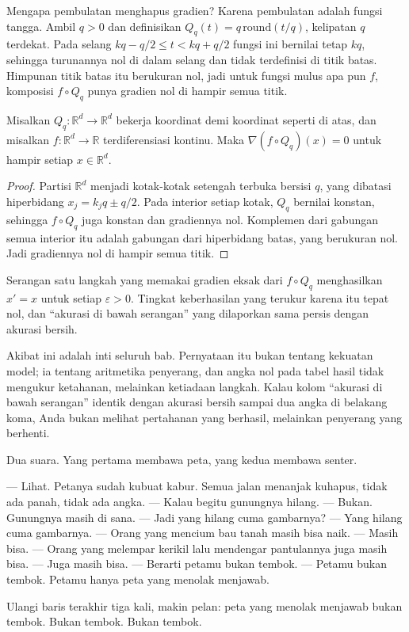 Mengapa pembulatan menghapus gradien? Karena pembulatan adalah fungsi tangga. Ambil
$q>0$ dan definisikan $Q_q(t)=q\,\mathrm{round}(t/q)$, kelipatan $q$ terdekat. Pada
selang $kq-q/2 \le t < kq+q/2$ fungsi ini bernilai tetap $kq$, sehingga turunannya nol
di dalam selang dan tidak terdefinisi di titik batas. Himpunan titik batas itu berukuran
nol, jadi untuk fungsi mulus apa pun $f$, komposisi $f\circ Q_q$ punya gradien nol di
hampir semua titik.

\begin{proposisi}
Misalkan $Q_q\colon\mathbb{R}^d\to\mathbb{R}^d$ bekerja koordinat demi koordinat
seperti di atas, dan misalkan $f\colon\mathbb{R}^d\to\mathbb{R}$ terdiferensiasi
kontinu. Maka $\nabla (f\circ Q_q)(x)=0$ untuk hampir setiap $x\in\mathbb{R}^d$.
\end{proposisi}

\begin{proof}
Partisi $\mathbb{R}^d$ menjadi kotak-kotak setengah terbuka bersisi $q$, yang dibatasi
hiperbidang $x_j=k_jq\pm q/2$. Pada interior setiap kotak, $Q_q$
bernilai konstan, sehingga $f\circ Q_q$ juga konstan dan gradiennya nol. Komplemen dari
gabungan semua interior itu adalah gabungan dari hiperbidang batas, yang berukuran
nol. Jadi gradiennya nol di hampir semua titik.
\end{proof}

\begin{akibat}
Serangan satu langkah yang memakai gradien eksak dari $f\circ Q_q$ menghasilkan
$x'=x$ untuk setiap $\varepsilon>0$. Tingkat keberhasilan yang terukur karena itu
tepat nol, dan ``akurasi di bawah serangan'' yang dilaporkan sama persis dengan akurasi
bersih.
\end{akibat}

Akibat ini adalah inti seluruh bab. Pernyataan itu bukan tentang kekuatan model; ia
tentang aritmetika penyerang, dan angka nol pada tabel hasil tidak mengukur ketahanan,
melainkan ketiadaan langkah. Kalau kolom ``akurasi di bawah serangan'' identik dengan
akurasi bersih sampai dua angka di belakang koma, Anda bukan melihat pertahanan yang
berhasil, melainkan penyerang yang berhenti.

\begin{bacakeras}
Dua suara. Yang pertama membawa peta, yang kedua membawa senter.

--- Lihat. Petanya sudah kubuat kabur. Semua jalan menanjak kuhapus, tidak ada panah,
tidak ada angka.
--- Kalau begitu gunungnya hilang.
--- Bukan. Gunungnya masih di sana.
--- Jadi yang hilang cuma gambarnya?
--- Yang hilang cuma gambarnya.
--- Orang yang mencium bau tanah masih bisa naik.
--- Masih bisa.
--- Orang yang melempar kerikil lalu mendengar pantulannya juga masih bisa.
--- Juga masih bisa.
--- Berarti petamu bukan tembok.
--- Petamu bukan tembok. Petamu hanya peta yang menolak menjawab.

Ulangi baris terakhir tiga kali, makin pelan: peta yang menolak menjawab bukan tembok.
Bukan tembok. Bukan tembok.
\end{bacakeras}

